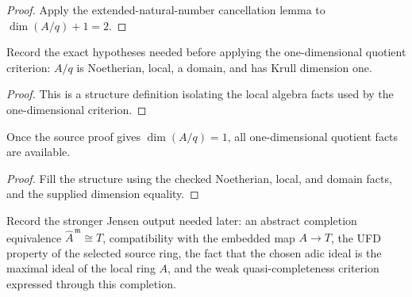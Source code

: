 \begin{proof}
  Apply the extended-natural-number cancellation lemma to
  \(\dim(A/q)+1=2\).
\end{proof}

\begin{definition}
  \label{def:quotient_dimension_one_facts}
  Record the exact hypotheses needed before applying the one-dimensional
  quotient criterion: \(A/q\) is Noetherian, local, a domain, and has Krull
  dimension one.
\end{definition}

\begin{proof}
  This is a structure definition isolating the local algebra facts used by the
  one-dimensional criterion.
\end{proof}

\begin{lemma}
  \label{lem:bad_quotient_source_data_quotient_dimension_one_facts_of_dim}
  Once the source proof gives \(\dim(A/q)=1\), all one-dimensional quotient
  facts are available.
\end{lemma}

\begin{proof}
  Fill the structure using the checked Noetherian, local, and domain facts,
  and the supplied dimension equality.
\end{proof}

\begin{definition}
  \label{def:jensen_completion_witness}
  Record the stronger Jensen output needed later: an abstract completion
  equivalence \(\widehat A^{\,\mathfrak m}\cong T\), compatibility with the
  embedded map \(A\to T\), the UFD property of the selected source ring, the
  fact that the chosen adic ideal is the maximal ideal of the local ring \(A\),
  and the weak quasi-completeness criterion expressed through this completion.
\end{definition}

